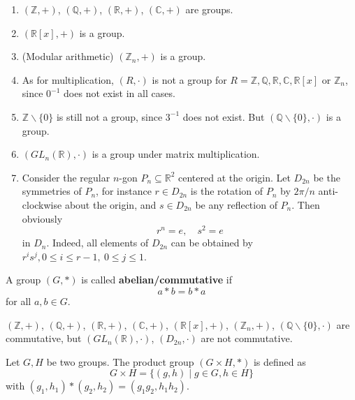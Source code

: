 \begin{example}
    \begin{enumerate}
        \item $(\mathbb{Z},+)$, $(\mathbb{Q},+)$, $(\mathbb{R},+)$, $(\mathbb{C},+)$ are groups.
        \item $(\mathbb{R}[x],+)$ is a group.
        \item (Modular arithmetic) $(\mathbb{Z}_n,+)$ is a group.
        \item As for multiplication, $(R,\cdot)$ is not a group for $R = \mathbb{Z}, \mathbb{Q}, \mathbb{R}, \mathbb{C}, \mathbb{R}[x]$ or $\mathbb{Z}_n$, since $0^{-1}$ does not exist in all cases.
        \item $\mathbb{Z} \backslash \{0\}$ is still not a group, since $3^{-1}$ does not exist. But $(\mathbb{Q}\backslash \{0\}, \cdot)$ is a group.
        \item $(GL_n(\mathbb{R}), \cdot)$ is a group under matrix multiplication.
        \item Consider the regular $n$-gon \(P_n \subseteq {\mathbb{R}}^{2}\) centered at the origin. Let \({D}_{2n}\) be the symmetries of $P_n$, for instance $r \in D_{2n}$ is the rotation of $P_n$ by $2\pi/n$ anti-clockwise about the origin, and $s \in D_{2n}$ be any reflection of $P_n$. Then obviously
        $$r^n = e, \quad s^2 = e$$
        in $D_n$. Indeed, all elements of \({D}_{2n}\) can be obtained by \({r}^{i}{s}^{j},0 \leq  i \leq  r-1,\ 0 \leq  j \leq  1\).
    \end{enumerate}
\end{example}    

\begin{definition}
    A group $(G, \ast)$ is called {\bf abelian/commutative} if
    $$a \ast b = b \ast a$$
    for all $a, b \in G$.
\end{definition}

\begin{example}
$(\mathbb{Z},+)$, $(\mathbb{Q},+)$, $(\mathbb{R},+)$, $(\mathbb{C},+)$, $(\mathbb{R}[x],+)$, $(\mathbb{Z}_n,+)$, $(\mathbb{Q}\backslash \{0\}, \cdot)$ are commutative, but $(GL_n(\mathbb{R}), \cdot)$, $(D_{2n}, \cdot)$ are not commutative.
\end{example}   


\begin{definition} Let \(G,H\) be two groups. The product group \(\left( {G \times  H, * }\right)\) is defined as
\[
G \times  H = \{ \left( {g,h}\right)  \mid  g \in  G,h \in  H\}
\]
with \(\left( {{g}_{1},{h}_{1}}\right)  * \left( {{g}_{2},{h}_{2}}\right)  = \left( {{g}_{1}{g}_{2},{h}_{1}{h}_{2}}\right)\).
\end{definition}

